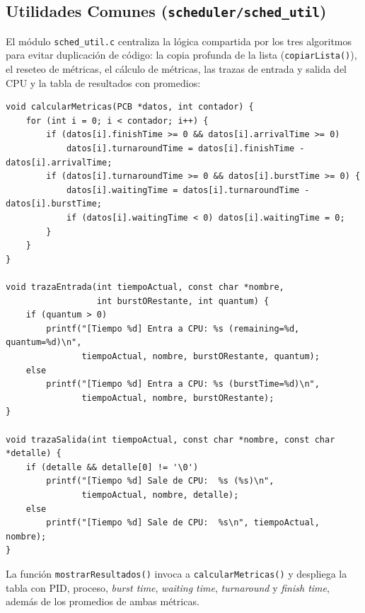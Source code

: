 \documentclass[12pt]{article}
\begin{document}
    \subsection{Utilidades Comunes (\texttt{scheduler/sched\_util})}
    El módulo \texttt{sched\_util.c} centraliza la lógica compartida por los tres algoritmos para evitar duplicación de código: la copia profunda de la lista (\texttt{copiarLista()}), el reseteo de métricas, el cálculo de métricas, las trazas de entrada y salida del CPU y la tabla de resultados con promedios:
    \begin{lstlisting}[caption={Calculo de metricas y trazas en sched_util.c.}]
void calcularMetricas(PCB *datos, int contador) {
    for (int i = 0; i < contador; i++) {
        if (datos[i].finishTime >= 0 && datos[i].arrivalTime >= 0)
            datos[i].turnaroundTime = datos[i].finishTime - datos[i].arrivalTime;
        if (datos[i].turnaroundTime >= 0 && datos[i].burstTime >= 0) {
            datos[i].waitingTime = datos[i].turnaroundTime - datos[i].burstTime;
            if (datos[i].waitingTime < 0) datos[i].waitingTime = 0;
        }
    }
}

void trazaEntrada(int tiempoActual, const char *nombre,
                  int burstORestante, int quantum) {
    if (quantum > 0)
        printf("[Tiempo %d] Entra a CPU: %s (remaining=%d, quantum=%d)\n",
               tiempoActual, nombre, burstORestante, quantum);
    else
        printf("[Tiempo %d] Entra a CPU: %s (burstTime=%d)\n",
               tiempoActual, nombre, burstORestante);
}

void trazaSalida(int tiempoActual, const char *nombre, const char *detalle) {
    if (detalle && detalle[0] != '\0')
        printf("[Tiempo %d] Sale de CPU:  %s (%s)\n",
               tiempoActual, nombre, detalle);
    else
        printf("[Tiempo %d] Sale de CPU:  %s\n", tiempoActual, nombre);
}
    \end{lstlisting}
    La función \texttt{mostrarResultados()} invoca a \texttt{calcularMetricas()} y despliega la tabla con PID, proceso, \textit{burst time}, \textit{waiting time}, \textit{turnaround} y \textit{finish time}, además de los promedios de ambas métricas.
\end{document}

